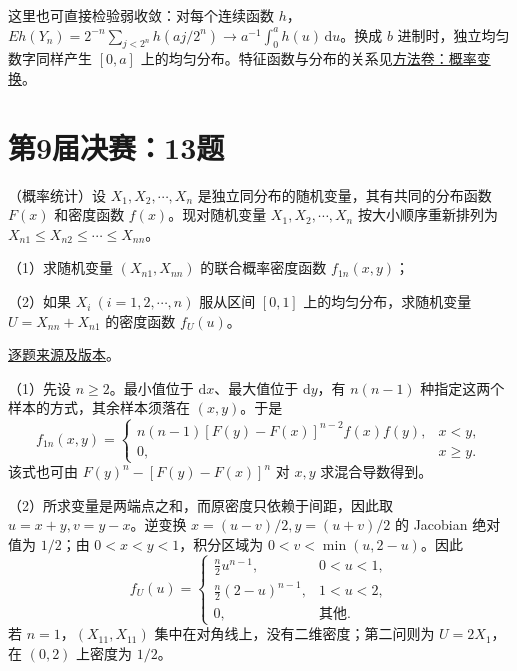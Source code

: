 \begin{remark}[方法与条件]

这里也可直接检验弱收敛：对每个连续函数 $h$，$Eh(Y_n)=2^{-n}\sum_{j<2^n}h(aj/2^n)\to a^{-1}\int_0^ah(u)\,\mathrm du$。换成 $b$ 进制时，独立均匀数字同样产生 $[0,a]$ 上的均匀分布。特征函数与分布的关系见\hyperref[app:probability-transforms]{方法卷：概率变换}。

\end{remark}

\section{第9届决赛：13题}\label{pr:fin09-hi:13}

\begin{example}[公开题解转录]\label{q:fin09-hi:13}

（概率统计）设 $X_1,X_2,\cdots,X_n$ 是独立同分布的随机变量，其有共同的分布函数 $F(x)$ 和密度函数 $f(x)$。现对随机变量 $X_1,X_2,\cdots,X_n$ 按大小顺序重新排列为 $X_{n1} \leq X_{n2} \leq \cdots \leq X_{nn}$。

（1）求随机变量 $(X_{n1},X_{nn})$ 的联合概率密度函数 $f_{1n}(x,y)$；

（2）如果 $X_i\ (i = 1,2,\cdots,n)$ 服从区间 $[0,1]$ 上的均匀分布，求随机变量 $U = X_{nn} + X_{n1}$ 的密度函数 $f_U(u)$。

\end{example}

\href{https://github.com/lzxcr/cmc-mathematics/blob/64916fa1fdbc3e444a652eca204d5669058ee321/src/problems/finals/09/15.md}{逐题来源及版本}。

\begin{solve}

（1）先设 $n\geq2$。最小值位于 $\mathrm dx$、最大值位于 $\mathrm dy$，有 $n(n-1)$ 种指定这两个样本的方式，其余样本须落在 $(x,y)$。于是
\[
f_{1n}(x,y)=\begin{cases}n(n-1)[F(y)-F(x)]^{n-2}f(x)f(y),&x<y,\\0,&x\geq y.\end{cases}
\]
该式也可由 $F(y)^n-[F(y)-F(x)]^n$ 对 $x,y$ 求混合导数得到。

（2）所求变量是两端点之和，而原密度只依赖于间距，因此取 $u=x+y,v=y-x$。逆变换 $x=(u-v)/2,y=(u+v)/2$ 的 Jacobian 绝对值为 $1/2$；由 $0<x<y<1$，积分区域为 $0<v<\min(u,2-u)$。因此
\[
f_U(u)=\begin{cases}\frac n2u^{n-1},&0<u<1,\\\frac n2(2-u)^{n-1},&1<u<2,\\0,&\text{其他}.\end{cases}
\]
若 $n=1$，$(X_{11},X_{11})$ 集中在对角线上，没有二维密度；第二问则为 $U=2X_1$，在 $(0,2)$ 上密度为 $1/2$。

\end{solve}

